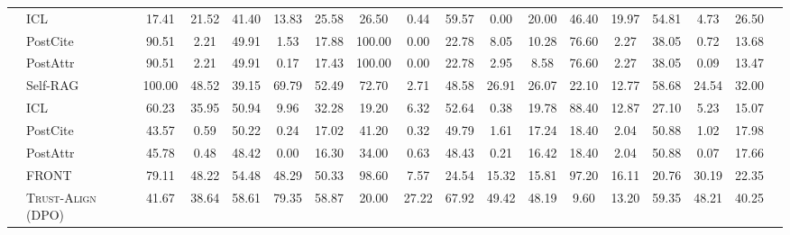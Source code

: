 \documentclass{article} %
\newcommand{\cdashlinelr}[1]{%
  \noalign{\vskip 2mm}  %
  \cdashline{#1}        %
  \noalign{\vskip 2mm}  %
}
\newcommand{\hlinelr}[1]{%
  \noalign{\vskip 2mm}  %
  \hline    
  \noalign{\vskip 2mm}  %
}
\newcommand{\method}[0]{\textsc{Trust-Align}}
\begin{document}
\begin{table}[htb!]
{\begin{tabular}{ll*{16}{c}}
\hlinelr{1-17}
\multirow{4}{*}{\mystack{LLaMA-2}{-13b}}  & ICL & 17.41 & 21.52 & 41.40 & 13.83 & 25.58 & 26.50 & 0.44 &  \cellcolor{lightyellow}59.57 & 0.00 & 20.00 & 46.40 & \cellcolor{lightyellow}19.97 &  54.81 & 4.73 & 26.50 \\
 & PostCite  & 90.51 & 2.21 & \cellcolor{lightyellow}49.91 & 1.53 & 17.88 & 100.00 & 0.00 & 22.78 & 8.05 & 10.28 & 76.60 & 2.27 & 38.05 & 0.72 & 13.68 \\
 & PostAttr & 90.51 & 2.21 & \cellcolor{lightyellow}49.91 & 0.17 & 17.43 & 100.00 & 0.00 & 22.78 & 2.95 & 8.58 & 76.60 & 2.27 & 38.05 & 0.09 & 13.47 \\
 & Self-RAG & 100.00 & \cellcolor{lightyellow}48.52 & 39.15 & \cellcolor{lightyellow}69.79 & \cellcolor{lightyellow}52.49 & 72.70 & \cellcolor{lightyellow}2.71 & 48.58 & \cellcolor{lightyellow} 26.91 & \cellcolor{lightyellow} 26.07 & 22.10 & 12.77 & \cellcolor{lightyellow}58.68 & \cellcolor{lightyellow}24.54 & \cellcolor{lightyellow} 32.00 \\

\hlinelr{1-17}
\multirow{6}{*}{\mystack{LLaMA-3.2}{-1b}} & ICL & 60.23 & 35.95 & 50.94 & 9.96 & 32.28 & 19.20 & 6.32 & 52.64 & 0.38 & 19.78 & 88.40 & 12.87 & 27.10 & 5.23 & 15.07 \\
& PostCite & 43.57 & 0.59 & 50.22 & 0.24 & 17.02 & 41.20 & 0.32 & 49.79 & 1.61 & 17.24 & 18.40 & 2.04 & 50.88 & 1.02 & 17.98 \\
& PostAttr & 45.78 & 0.48 & 48.42 & 0.00 & 16.30 & 34.00 & 0.63 & 48.43 & 0.21 & 16.42 & 18.40 & 2.04 & 50.88 & 0.07 & 17.66 \\
& FRONT & 79.11 & \cellcolor{lightyellow}48.22 & 54.48 & 48.29 & 50.33 & 98.60 & 7.57 & 24.54 & 15.32 & 15.81 & 97.20 & 16.11 & 20.76 & 30.19 & 22.35 \\

\cdashlinelr{2-17}
& \method{} (DPO) & 41.67 & 38.64 & \cellcolor{lightyellow}58.61 & \cellcolor{lightyellow}79.35 & \cellcolor{lightyellow}58.87 & 20.00 & \cellcolor{lightyellow}27.22 & \cellcolor{lightyellow}67.92 & \cellcolor{lightyellow}49.42 & \cellcolor{lightyellow}48.19 & 9.60  & \cellcolor{lightyellow}13.20 & \cellcolor{lightyellow}59.35 & \cellcolor{lightyellow}48.21 & \cellcolor{lightyellow}40.25 \\


\end{tabular}}
\end{table}
\end{document}
